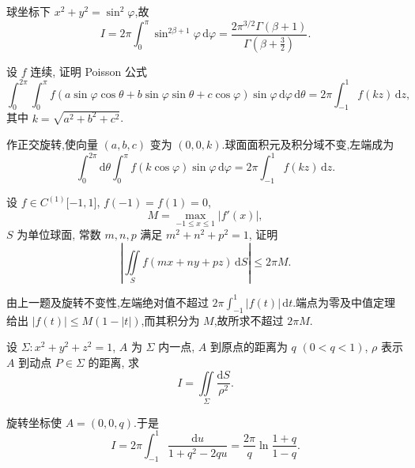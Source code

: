 \begin{solution}
    球坐标下 $x^2+y^2=\sin^2\varphi$,故
    \[
        I=2\pi\int_0^\pi\sin^{2\beta+1}\varphi\,\mathrm{d}\varphi
        =\dfrac{2\pi^{3/2}\Gamma(\beta+1)}{\Gamma(\beta+\frac{3}{2})}.
    \]
\end{solution}

\begin{example}
    设 $f$ 连续, 证明 Poisson 公式
    \[
        \displaystyle\int_0^{2\pi}\int_0^\pi
        f(a\sin\varphi\cos\theta+b\sin\varphi\sin\theta+c\cos\varphi)
        \sin\varphi\,\mathrm{d}\varphi\,\mathrm{d}\theta
        =2\pi\int_{-1}^1f(kz)\,\mathrm{d}z,
    \]
    其中 $k=\sqrt{a^2+b^2+c^2}$.
\end{example}
\exampleblank

\begin{solution}
    作正交旋转,使向量 $(a,b,c)$ 变为 $(0,0,k)$.球面面积元及积分域不变,左端成为
    \[
        \displaystyle\int_0^{2\pi}\!\mathrm{d}\theta\int_0^\pi f(k\cos\varphi)\sin\varphi\,\mathrm{d}\varphi
        =2\pi\int_{-1}^1f(kz)\,\mathrm{d}z.
    \]
\end{solution}

\begin{example}
    设 $f\in C^{(1)}\lbrack-1,1\rbrack$, $f(-1)=f(1)=0$,
    \[
        M=\max_{-1\leq x\leq1}|f'(x)|,
    \]
    $S$ 为单位球面, 常数 $m,n,p$ 满足 $m^2+n^2+p^2=1$, 证明
    \[
        \left|\iint\limits_Sf(mx+ny+pz)\,\mathrm{d}S\right|\leq2\pi M.
    \]
\end{example}
\exampleblank

\begin{solution}
    由上一题及旋转不变性,左端绝对值不超过 $2\pi\displaystyle\int_{-1}^1|f(t)|\,\mathrm{d}t$.端点为零及中值定理给出 $|f(t)|\leq M(1-|t|)$,而其积分为 $M$,故所求不超过 $2\pi M$.
\end{solution}

\begin{example}
    设 $\Sigma:x^2+y^2+z^2=1$, $A$ 为 $\Sigma$ 内一点, $A$ 到原点的距离为 $q$ $(0<q<1)$, $\rho$ 表示 $A$ 到动点 $P\in\Sigma$ 的距离, 求
    \[
        I=\iint\limits_\Sigma\dfrac{\mathrm{d}S}{\rho^2}.
    \]
\end{example}
\exampleblank

\begin{solution}
    旋转坐标使 $A=(0,0,q)$.于是
    \[
        I=2\pi\int_{-1}^1\dfrac{\mathrm{d}u}{1+q^2-2qu}
        =\dfrac{2\pi}{q}\ln\dfrac{1+q}{1-q}.
    \]
\end{solution}

